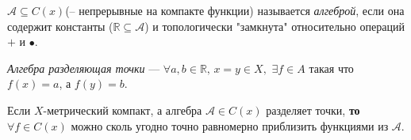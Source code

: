 
\begin{to_def}
    $\mathcal{A} \subseteq C(x)$(-- непрерывные на компакте функции) называется \textit{алгеброй}, если она содержит константы ($\mathbb{R} \subseteq \mathcal{A}$) и топологически "замкнута" относительно операций $+$ и $\bullet$.
\end{to_def}

\begin{to_def}
    \textit{Алгебра разделяющая точки} --- $\forall a, b \in \mathbb{R},\, x=y \in X,\, \, \exists f \in A$ такая что $f(x)=a$, а $f(y) = b$.
\end{to_def}

\begin{to_thr}
    Если $X$-метрический компакт, а алгебра $\mathcal{A}\in C(x)$ разделяет точки, \textbf{то} $\forall f \in C(x)$ можно сколь угодно точно равномерно приблизить функциями из $\mathcal{A}$.
\end{to_thr}